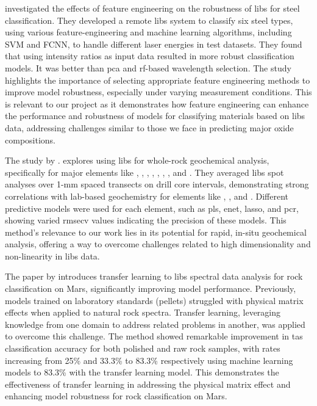 \citet{jeonEffectsFeatureEngineering2024} investigated the effects of feature engineering on the robustness of \gls{libs} for steel classification.
They developed a remote \gls{libs} system to classify six steel types, using various feature-engineering and machine learning algorithms, including SVM and FCNN, to handle different laser energies in test datasets.
They found that using intensity ratios as input data resulted in more robust classification models.
It was better than \gls{pca} and \gls{rf}-based wavelength selection.
The study highlights the importance of selecting appropriate feature engineering methods to improve model robustness, especially under varying measurement conditions.
This is relevant to our project as it demonstrates how feature engineering can enhance the performance and robustness of models for classifying materials based on \gls{libs} data, addressing challenges similar to those we face in predicting major oxide compositions.

The study by \citet{fontanaLaserInducedBreakdown2023}.
explores using \gls{libs} for whole-rock geochemical analysis, specifically for major elements like , , , , , , , and .
They averaged \gls{libs} spot analyses over 1-mm spaced transects on drill core intervals, demonstrating strong correlations with lab-based geochemistry for elements like , , and .
Different predictive models were used for each element, such as \gls{pls}, \gls{enet}, \gls{lasso}, and \gls{pcr}, showing varied \gls{rmsecv} values indicating the precision of these models.
This method's relevance to our work lies in its potential for rapid, in-situ geochemical analysis, offering a way to overcome challenges related to high dimensionality and non-linearity in \gls{libs} data.

The paper by \citet{sunMachineLearningTransfer2021} introduces transfer learning to \gls{libs} spectral data analysis for rock classification on Mars, significantly improving model performance.
Previously, models trained on laboratory standards (pellets) struggled with physical matrix effects when applied to natural rock spectra.
Transfer learning, leveraging knowledge from one domain to address related problems in another, was applied to overcome this challenge.
The method showed remarkable improvement in \gls{tas} classification accuracy for both polished and raw rock samples, with rates increasing from 25\% and 33.3\% to 83.3\% respectively using machine learning models to 83.3\% with the transfer learning model.
This demonstrates the effectiveness of transfer learning in addressing the physical matrix effect and enhancing model robustness for rock classification on Mars.

